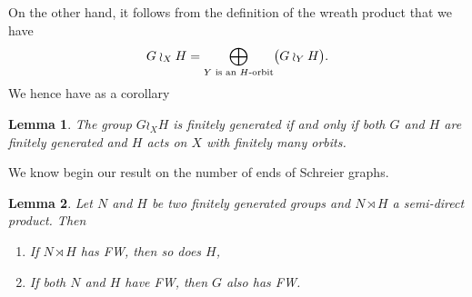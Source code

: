 \documentclass[a4paper]{article}
\newtheorem{lem}{Lemma}[section]
\theoremstyle{definition}
\theoremstyle{remark}%
\begin{document}
On the other hand, it follows from the definition of the wreath product that we have
\[
G\wr_XH=\bigoplus_{Y\textnormal{ is an $H$-orbit}}\bigl(G\wr_YH\bigr).
\]
We hence have as a corollary
\begin{lem}
The group $G\wr_XH$ is finitely generated if and only if both $G$ and $H$ are finitely generated and $H$ acts on $X$ with finitely many orbits.
\end{lem}
%
%
%
%
%
We know begin our result on the number of ends of Schreier graphs.
\begin{lem}\label{Lemma:Semidirect_ends}
Let $N$ and $H$ be two finitely generated groups and $N\rtimes H$ a semi-direct product.
Then
\begin{enumerate}
\item If $N\rtimes H$ has FW, then so does $H$,
\item If both $N$ and $H$ have FW, then $G$ also has FW.
\end{enumerate}
\end{lem}
\end{document}
